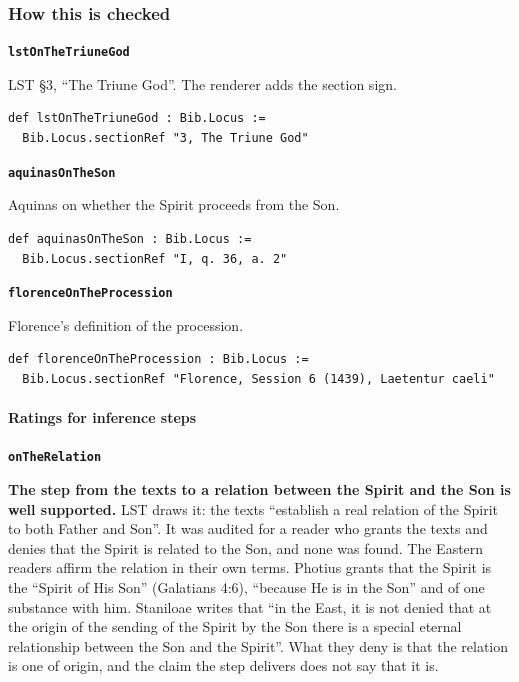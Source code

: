 \documentclass[11pt,paper=\testimonypaper,DIV=13,parskip=false]{scrartcl}
\begin{document}
\subsubsection*{How this is checked}
\par\medskip\noindent\textbf{\texttt{lst\allowbreak{}On\allowbreak{}The\allowbreak{}Triune\allowbreak{}God}}\par\nobreak\noindent
LST §3, “The Triune God”. The renderer adds the section sign.

{\small\begin{verbatim}
def lstOnTheTriuneGod : Bib.Locus :=
  Bib.Locus.sectionRef "3, The Triune God"
\end{verbatim}}
\par\medskip\noindent\textbf{\texttt{aquinas\allowbreak{}On\allowbreak{}The\allowbreak{}Son}}\par\nobreak\noindent
Aquinas on whether the Spirit proceeds from the Son.

{\small\begin{verbatim}
def aquinasOnTheSon : Bib.Locus :=
  Bib.Locus.sectionRef "I, q. 36, a. 2"
\end{verbatim}}
\par\medskip\noindent\textbf{\texttt{florence\allowbreak{}On\allowbreak{}The\allowbreak{}Procession}}\par\nobreak\noindent
Florence’s definition of the procession.

{\small\begin{verbatim}
def florenceOnTheProcession : Bib.Locus :=
  Bib.Locus.sectionRef "Florence, Session 6 (1439), Laetentur caeli"
\end{verbatim}}
\paragraph*{Ratings for inference steps}
\leavevmode\par\nobreak
\par\medskip\noindent\textbf{\texttt{on\allowbreak{}The\allowbreak{}Relation}}\par\nobreak\noindent
\textbf{The step from the texts to a relation between the Spirit and the Son is well supported.} LST draws it: the texts “establish a real relation of the Spirit to both Father and Son”. It was audited for a reader who grants the texts and denies that the Spirit is related to the Son, and none was found. The Eastern readers affirm the relation in their own terms. Photius grants that the Spirit is the “Spirit of His Son” (Galatians 4:6), “because He is in the Son” and of one substance with him. Staniloae writes that “in the East, it is not denied that at the origin of the sending of the Spirit by the Son there is a special eternal relationship between the Son and the Spirit”. What they deny is that the relation is one of origin, and the claim the step delivers does not say that it is.
\end{document}
